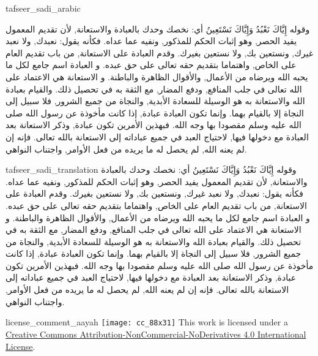 \begin{taggedblock}{tafseer_sadi_arabic}
\begin{Arabic}
وقوله
{ إِيَّاكَ نَعْبُدُ وَإِيَّاكَ نَسْتَعِينُ }
أي: نخصك وحدك بالعبادة والاستعانة, لأن تقديم المعمول يفيد الحصر, وهو إثبات الحكم للمذكور, ونفيه عما عداه. فكأنه يقول: نعبدك, ولا نعبد غيرك, ونستعين بك, ولا نستعين بغيرك. وقدم العبادة على الاستعانة, من باب تقديم العام على الخاص, واهتماما بتقديم حقه تعالى على حق عبده. و
{ العبادة }
اسم جامع لكل ما يحبه الله ويرضاه من الأعمال, والأقوال الظاهرة والباطنة. و
{ الاستعانة }
هي الاعتماد على الله تعالى في جلب المنافع, ودفع المضار, مع الثقة به في تحصيل ذلك. والقيام بعبادة الله والاستعانة به هو الوسيلة للسعادة الأبدية, والنجاة من جميع الشرور, فلا سبيل إلى النجاة إلا بالقيام بهما. وإنما تكون العبادة عبادة, إذا كانت مأخوذة عن رسول الله صلى الله عليه وسلم مقصودا بها وجه الله. فبهذين الأمرين تكون عبادة, وذكر
{ الاستعانة }
بعد
{ العبادة }
مع دخولها فيها, لاحتياج العبد في جميع عباداته إلى الاستعانة بالله تعالى. فإنه إن لم يعنه الله, لم يحصل له ما يريده من فعل الأوامر, واجتناب النواهي.
\end{Arabic}
\end{taggedblock}
\begin{taggedblock}{tafseer_sadi_translation}
وقوله
{ إِيَّاكَ نَعْبُدُ وَإِيَّاكَ نَسْتَعِينُ }
أي: نخصك وحدك بالعبادة والاستعانة, لأن تقديم المعمول يفيد الحصر, وهو إثبات الحكم للمذكور, ونفيه عما عداه. فكأنه يقول: نعبدك, ولا نعبد غيرك, ونستعين بك, ولا نستعين بغيرك. وقدم العبادة على الاستعانة, من باب تقديم العام على الخاص, واهتماما بتقديم حقه تعالى على حق عبده. و
{ العبادة }
اسم جامع لكل ما يحبه الله ويرضاه من الأعمال, والأقوال الظاهرة والباطنة. و
{ الاستعانة }
هي الاعتماد على الله تعالى في جلب المنافع, ودفع المضار, مع الثقة به في تحصيل ذلك. والقيام بعبادة الله والاستعانة به هو الوسيلة للسعادة الأبدية, والنجاة من جميع الشرور, فلا سبيل إلى النجاة إلا بالقيام بهما. وإنما تكون العبادة عبادة, إذا كانت مأخوذة عن رسول الله صلى الله عليه وسلم مقصودا بها وجه الله. فبهذين الأمرين تكون عبادة, وذكر
{ الاستعانة }
بعد
{ العبادة }
مع دخولها فيها, لاحتياج العبد في جميع عباداته إلى الاستعانة بالله تعالى. فإنه إن لم يعنه الله, لم يحصل له ما يريده من فعل الأوامر, واجتناب النواهي.
\end{taggedblock}
\begin{taggedblock}{license_comment_aayah}
\texttt{[image: cc\_88x31]}
This work is licensed under a 
\href{http://creativecommons.org/licenses/by-nc-nd/4.0/}{Creative Commons Attribution-NonCommercial-NoDerivatives 4.0 International License}.
\end{taggedblock}
\begin{comment}
Please use the following for footnotes:- Sample\footnoteQ{Text of Qur'an footnote goes here.}.
Sample\footnoteT{Text of Tafseer footnote goes here.}.
\end{comment}